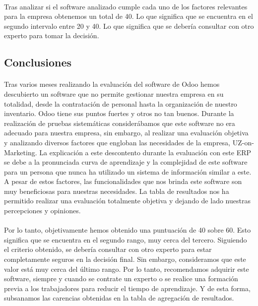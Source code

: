 \paragraph{}
Tras analizar si el software analizado cumple cada uno de los factores relevantes para la empresa obtenemos un total de 40. Lo que significa que se encuentra en el segundo intervalo entre 20 y 40. Lo que significa que se debería consultar con otro experto para tomar la decisión. 
\subsection{Conclusiones}
\paragraph{}
Tras varios meses realizando la evaluación del software de Odoo hemos descubierto un software que no permite gestionar nuestra empresa en su totalidad, desde la contratación de personal hasta la organización de nuestro inventario. Odoo tiene sus puntos fuertes y otros no tan buenos. Durante la realización de pruebas sistemáticas considerábamos que este software no era adecuado para nuestra empresa, sin embargo, al realizar una evaluación objetiva y analizando diversos factores que engloban las necesidades de la empresa, UZ-on-Marketing. La explicación a este descontento durante la evaluación con este ERP se debe a la pronunciada curva de aprendizaje y la complejidad de este software para un persona que nunca ha utilizado un sistema de información similar a este. A pesar de estos factores, las funcionalidades que nos brinda este software son muy beneficiosas para nuestras necesidades. La tabla de resultados nos ha permitido realizar una evaluación totalmente objetiva y dejando de lado nuestras percepciones y opiniones.

\paragraph{}
Por lo tanto, objetivamente hemos obtenido una puntuación de 40 sobre 60. Esto significa que se encuentra en el segundo rango, muy cerca del tercero. Siguiendo el criterio obtenido, se debería consultar con otro experto para estar completamente seguros en la decisión final. Sin embargo, consideramos que este valor está muy cerca del último rango. Por lo tanto, recomendamos adquirir este software, siempre y cuando se contrate un experto o se realice una formación previa a los trabajadores para reducir el tiempo de aprendizaje. Y de esta forma, subsanamos las carencias obtenidas en la tabla de agregación de resultados.